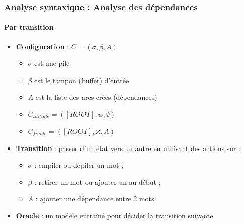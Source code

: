 \documentclass[xcolor=table]{beamer}
\begin{document}
\begin{frame}
\frametitle{Analyse syntaxique : Analyse des dépendances}
\framesubtitle{Par transition}

\begin{minipage}{.6\textwidth}
	\begin{itemize}
		\item \textbf{Configuration} :  $C = (\sigma, \beta, A)$
		\begin{itemize}
			\item $\sigma$ est une pile
			\item $\beta$ est le tampon (buffer) d'entrée
			\item $A$ est la liste des arcs créés (dépendances)
			\item $C_{initiale} = ([ROOT], w, \emptyset)$
			\item $C_{finale} = ([ROOT], \varnothing, A)$
		\end{itemize}
	\end{itemize}
\end{minipage}
\begin{minipage}{.38\textwidth}
\end{minipage}

\begin{itemize}
	\item \textbf{Transition} : passer d'un état vers un autre en utilisant des actions sur :
	\begin{itemize}
		\item $\sigma$ : empiler ou dépiler un mot ;
		\item $\beta$ : retirer un mot ou ajouter un au début ;
		\item $A$ : ajouter une dépendance entre 2 mots.
	\end{itemize}
	\item \textbf{Oracle} : un modèle entraîné pour décider la transition suivante
\end{itemize}

\end{frame}
\end{document}
